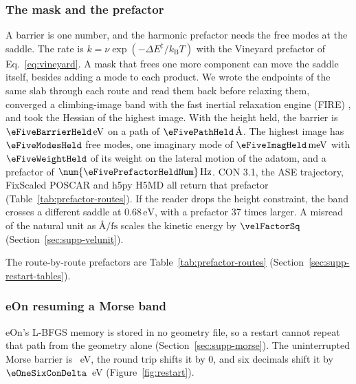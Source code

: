 \subsubsection{The mask and the prefactor}\label{sec:mask-prefactor}
A barrier
is one number, and the harmonic prefactor needs the free modes at the
saddle.
The rate is \(k=\nu\exp(-\Delta E^\ddagger/k_{\mathrm{B}}T)\) with the Vineyard prefactor of Eq.~\eqref{eq:vineyard}.
A mask that frees one more component can move the saddle itself, besides
adding a mode to each product.
We wrote the endpoints of the same slab through each route and read them
back before relaxing them, converged a climbing-image band with the fast
inertial relaxation engine (FIRE)
\cite{bitzekStructuralRelaxationMade2006}, and took the Hessian of the
highest image.
With the height held, the barrier is \(\eFiveBarrierHeld\,\mathrm{eV}\)
on a path of \(\eFivePathHeld\,\text{\AA}\).
The highest image has \(\eFiveModesHeld\) free modes, one imaginary mode
of \(\eFiveImagHeld\,\mathrm{meV}\) with \(\eFiveWeightHeld\) of its
weight on the lateral motion of the adatom, and a prefactor of
\(\num{\eFivePrefactorHeldNum}\,\mathrm{Hz}\).
CON 3.1, the ASE trajectory, FixScaled POSCAR and h5py H5MD all return
that prefactor (Table~\ref{tab:prefactor-routes}).
If the reader drops the height constraint, the band crosses a different
saddle at \(0.68\,\mathrm{eV}\), with a prefactor 37 times larger.
A misread of the natural unit as \(\text{\AA}/\mathrm{fs}\) scales the kinetic energy by \(\velFactorSq\) (Section~\ref{sec:supp-velunit}).

The route-by-route prefactors are Table~\ref{tab:prefactor-routes} (Section~\ref{sec:supp-restart-tables}).


\subsubsection{eOn resuming a Morse band}\label{sec:morse-resume}
eOn's L-BFGS memory is stored in no geometry file, so a restart cannot repeat that path from the geometry alone (Section~\ref{sec:supp-morse}).
The uninterrupted Morse barrier is \eOneBarrierLbfgs~eV, the round trip shifts it by 0, and six decimals shift it by \(\eOneSixConDelta\)~eV (Figure~\ref{fig:restart}).


